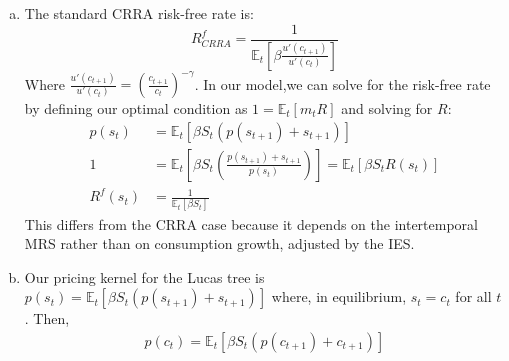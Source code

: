 \documentclass{article}
\newcommand{\Et}[1]{\mathbb{E}_t\left[#1\right]}
\begin{document}
\begin{enumerate}[(a)]
	\item The standard CRRA risk-free rate is:
		\[
			R^f_{CRRA} = \frac{1}{\Et{\beta\frac{u'(c_{t+1})}{u'(c_t)}}}
		\]
		Where ${\frac{u'(c_{t+1})}{u'(c_t)}=\left(\frac{c_{t+1}}{c_{t}}\right)^{-\gamma}}$. In our model,we can solve for the risk-free rate by defining our optimal condition as ${1 = \Et{m_tR}}$ and solving for $R$:
		\begin{align*}
			p(s_t) &= \Et{\beta S_t(p(s_{t+1})+s_{t+1})}	\\
			1 &= \Et{\beta S_t\left(\frac{p(s_{t+1})+s_{t+1}}{p(s_t)}\right)} = \Et{\beta S_tR(s_t)}	\\
			R^f(s_t) &= \frac{1}{\Et{\beta S_t}}
		\end{align*}
		This differs from the CRRA case because it depends on the intertemporal MRS rather than on consumption growth, adjusted by the IES.
	
	\item Our pricing kernel for the Lucas tree is ${p(s_t) = \Et{\beta S_t(p(s_{t+1})+s_{t+1})}}$ where, in equilibrium, ${s_t = c_t}$ for all $t$. Then, 
		\begin{align*}
			p(c_t) = \Et{\beta S_t(p(c_{t+1})+c_{t+1})}
		\end{align*}
	
	
\end{enumerate}

\end{document}
